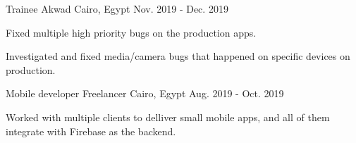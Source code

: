 \begin{cventries}
  \cventry
    {Trainee} %
    {Akwad} %
    {Cairo, Egypt} %
    {Nov. 2019 - Dec. 2019} %
    {
      \begin{cvitems}
        \item {Fixed multiple high priority bugs on the production apps.}
        \item {Investigated and fixed media/camera bugs that happened on specific devices on production.}
      \end{cvitems}
    }

  \cventry
    {Mobile developer} %
    {Freelancer} %
    {Cairo, Egypt} %
    {Aug. 2019 - Oct. 2019} %
    {
      \begin{cvitems}
        Worked with multiple clients to delliver small mobile apps, and all of them integrate with Firebase as the backend.
      \end{cvitems}
    }

\end{cventries}
